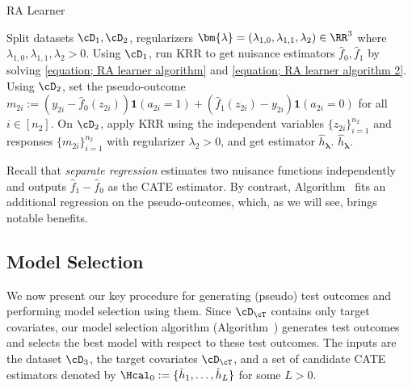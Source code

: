 \documentclass[12pt,a4paper,pdftex,onepage]{article}
\begin{document}
\begin{algorithm}[H]
\caption{RA Learner}
\label{algorithm; RA learner}
\begin{algorithmic}
\Require  Split datasets \(\cD_1, \cD_2\), regularizers  \(\bm{\lambda }  = (\lambda_{1,0}, \lambda_{1,1}, \lambda_2) \in \RR^3\) where \(\lambda_{1,0}, \lambda_{1,1}, \lambda_2 >0 \).
\State Using \(\cD_1\), run KRR to get nuisance estimators \(\hat{f}_0, \hat{f}_1\) by solving \eqref{equation; RA learner algorithm} and \eqref{equation; RA learner algorithm 2}.
\State Using \(\cD_2\), set the pseudo-outcome \(m_{2i} := (y_{2i} - \hat{f}_0(z_{2i}) )\bm{1}(a_{2i}=1) + (\hat{f}_1(z_{2i}) - y_{2i} )\bm{1}(a_{2i}=0)\) for all \(i \in [n_2]\).
\State On \(\cD_2\), apply KRR using the independent variables \(\{z_{2i}\}_{i=1}^{n_2}\) and responses \(\{m_{2i}\}_{i=1}^{n_2}\) with regularizer \(\lambda_2 > 0\), and get estimator \(\hat{h}_{\bm{\lambda}}\).
\Ensure \(\hat{h}_{\bm{\lambda}}\).

\end{algorithmic}
\end{algorithm}

Recall that \emph{separate regression} estimates two nuisance functions independently and outputs $\hat{f}_1 - \hat{f}_0$ as the CATE estimator.  
By contrast, Algorithm~ fits an additional regression on the pseudo-outcomes, which, as we will see, brings notable benefits.

\subsection{Model Selection}
We now present our key procedure for generating (pseudo) test outcomes and performing model selection using them.  
Since \(\cD_\cT\) contains only target covariates, our model selection algorithm (Algorithm~) generates test outcomes and selects the best model with respect to these test outcomes.
The inputs are the dataset \(\cD_3\), the target covariates \(\cD_\cT\), and a set of candidate CATE estimators denoted by \(\Hcal_0 := \{\hat{h}_1, \dots, \hat{h}_L\}\) for some \(L > 0\).
\end{document}
